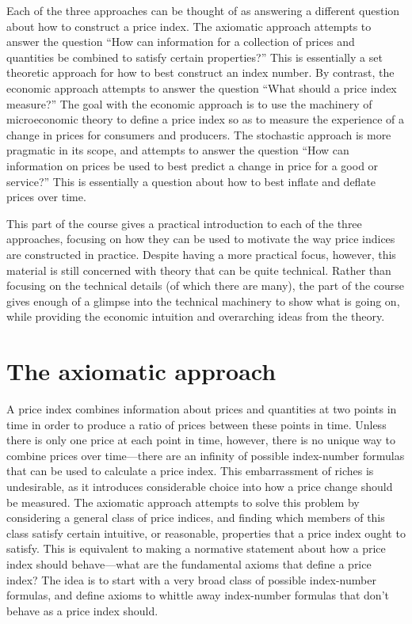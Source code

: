\documentclass[]{article}
\begin{document}
Each of the three approaches can be thought of as answering a different question about how to construct a price index. The axiomatic approach attempts to answer the question ``How can information for a collection of prices and quantities be combined to satisfy certain properties?'' This is essentially a set theoretic approach for how to best construct an index number. By contrast, the economic approach attempts to answer the question ``What should a price index measure?'' The goal with the economic approach is to use the machinery of microeconomic theory to define a price index so as to measure the experience of a change in prices for consumers and producers. The stochastic approach is more pragmatic in its scope, and attempts to answer the question ``How can information on prices be used to best predict a change in price for a good or service?'' This is essentially a question about how to best inflate and deflate prices over time.

This part of the course gives a practical introduction to each of the three approaches, focusing on how they can be used to motivate the way price indices are constructed in practice. Despite having a more practical focus, however, this material is still concerned with theory that can be quite technical. Rather than focusing on the technical details (of which there are many), the part of the course gives enough of a glimpse into the technical machinery to show what is going on, while providing the economic intuition and overarching ideas from the theory.

\hypertarget{the-axiomatic-approach}{%
\section{The axiomatic approach}\label{the-axiomatic-approach}}

A price index combines information about prices and quantities at two points in time in order to produce a ratio of prices between these points in time. Unless there is only one price at each point in time, however, there is no unique way to combine prices over time---there are an infinity of possible index-number formulas that can be used to calculate a price index. This embarrassment of riches is undesirable, as it introduces considerable choice into how a price change should be measured. The axiomatic approach attempts to solve this problem by considering a general class of price indices, and finding which members of this class satisfy certain intuitive, or reasonable, properties that a price index ought to satisfy. This is equivalent to making a normative statement about how a price index should behave---what are the fundamental axioms that define a price index? The idea is to start with a very broad class of possible index-number formulas, and define axioms to whittle away index-number formulas that don't behave as a price index should.
\end{document}
